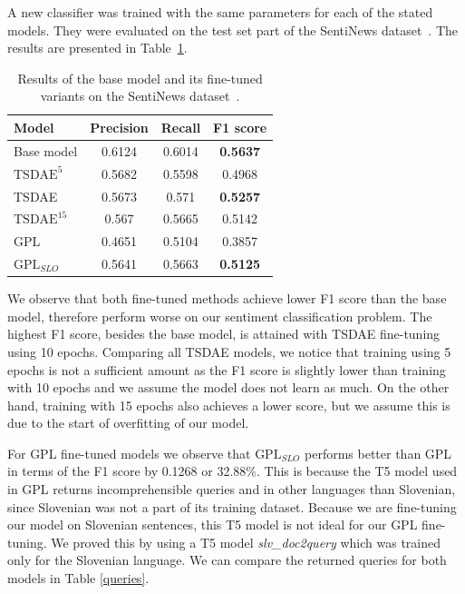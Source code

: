 \documentclass[fleqn,moreauthors,10pt]{ds_report}
\begin{document}
A new classifier was trained with the same parameters for each of the stated models. They were evaluated on the test set part of the SentiNews dataset~\cite{sentiNews}. The results are presented in Table~\ref{tab2}.

\begin{table}[!h]
	\footnotesize
	\begin{center}
		\begin{tabular}{ |l|c|c|c| }
		\hline
		\rowcolor{Blue}Model & Precision & Recall & F1 score\\
		\hline

		Base model & 0.6124 & 0.6014 & \textbf{0.5637}\\
		\hline
		$\text{TSDAE}^{5}$ & 0.5682 & 0.5598 & 0.4968\\
		TSDAE &  0.5673 & 0.571 & \textbf{0.5257}\\
		$\text{TSDAE}^{15}$ & 0.567 & 0.5665 & 0.5142\\
		\hline
		GPL & 0.4651 & 0.5104 & 0.3857\\
		$\text{GPL}_{SLO}$ & 0.5641 & 0.5663 & \textbf{0.5125}\\

		\hline
		\end{tabular}
	\end{center}
\caption{Results of the base model and its fine-tuned variants on the SentiNews dataset~\cite{sentiNews}.}
\label{tab2}
\end{table}


We observe that both fine-tuned methods achieve lower F1 score than the base model, therefore perform worse on our sentiment classification problem. The highest F1 score, besides the base model, is attained with TSDAE fine-tuning using 10 epochs. Comparing all TSDAE models, we notice that training using 5 epochs is not a sufficient amount as the F1 score is slightly lower than training with 10 epochs and we assume the model does not learn as much. On the other hand, training with 15 epochs also achieves a lower score, but we assume this is due to the start of overfitting of our model.

For GPL fine-tuned models we observe that $\text{GPL}_{SLO}$ performs better than GPL in terms of the F1 score by 0.1268 or 32.88\%. This is because the T5 model used in GPL returns incomprehensible queries and in other languages than Slovenian,
since Slovenian was not a part of its training dataset. Because we are fine-tuning our model on Slovenian sentences, this T5 model is not ideal for our GPL fine-tuning. We proved this by using a T5 model {\it slv\_doc2query} which was trained only for the Slovenian language. We can compare the returned queries for both models in Table \ref*{queries}.
\end{document}
